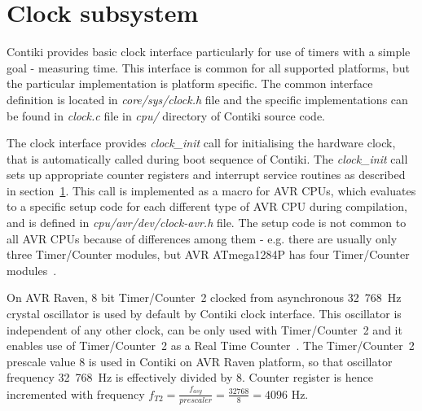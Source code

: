 
\section{Clock subsystem}\label{sec:analysis-clock}
Contiki provides basic clock interface particularly for use of timers
with a simple goal - measuring time.
This interface is common for all supported platforms,
but the particular implementation is platform specific.
The common interface definition is located in {\it{core/sys/clock.h}} file
and the specific implementations can be found in {\it{clock.c}} file
in {\it{cpu/}} directory of Contiki source code.

The clock interface provides {\it{clock\_init}} call for initialising the hardware clock,
that is automatically called during boot sequence of Contiki.
The {\it{clock\_init}} call sets up
appropriate counter registers and interrupt service routines as described in section~\ref{sec:analysis-clock}.
This call is implemented as a macro for AVR CPUs, which evaluates to a specific setup code for each
different type of AVR CPU during compilation, and is defined in {\it{cpu/avr/dev/clock-avr.h}} file.
The setup code is not common to all AVR CPUs because of differences among them - e.g. there are usually
only three Timer/Counter modules, but AVR ATmega1284P has four Timer/Counter modules~\cite{avr-datasheet}.

On AVR Raven, 8 bit Timer/Counter~2 clocked from asynchronous 32~768~Hz crystal oscillator
is used by default by Contiki clock interface.
This oscillator is independent of any other clock,
can be only used with Timer/Counter~2 and it
enables use of Timer/Counter~2 as a Real Time Counter~\cite{avr-datasheet}.
The Timer/Counter~2 prescale value 8 is used in Contiki on AVR Raven platform,
so that oscillator frequency 32~768~Hz is effectively divided by 8.
Counter register is hence incremented with frequency
$f_{T2} = {\frac{f_{asy}}{prescaler}} = {\frac{32768}{8}} = 4096$ Hz.


